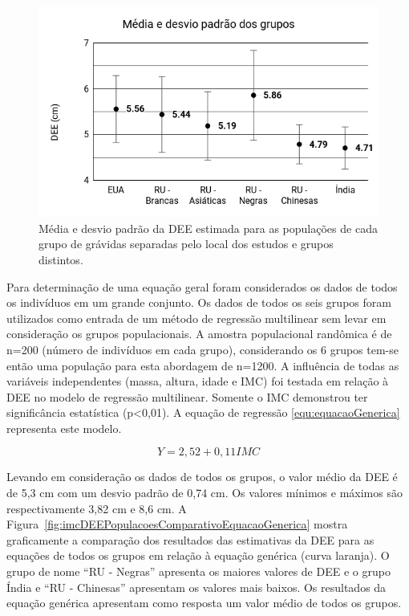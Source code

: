 \begin{figure}[ht!]
    \centering
    \includegraphics[width=0.8\linewidth]{capitulos/figuras/Media e desvio padrao dos grupos.png} 
    \caption{Média e desvio padrão da \acrshort{DEE} estimada para as populações de cada grupo de grávidas separadas pelo local dos estudos e grupos distintos.}
    \label{fig:mediaDesvioPadraoPopulacoes}
\end{figure}

Para determinação de uma equação geral foram considerados os dados de todos os indivíduos em um grande conjunto. Os dados de todos os seis grupos foram utilizados como entrada de um método de regressão multilinear sem levar em consideração os grupos populacionais. A amostra populacional randômica é de n=200 (número de indivíduos em cada grupo), considerando os 6 grupos tem-se então uma população para esta abordagem de n=1200. A influência de todas as variáveis independentes (massa, altura, idade e \acrshort{IMC}) foi testada em relação à \acrshort{DEE} no modelo de regressão multilinear. Somente o \acrshort{IMC} demonstrou ter significância estatística (p<0,01). A equação de regressão \ref{equ:equacaoGenerica} representa este modelo. 

\begin{equation}
\label{equ:equacaoGenerica}
Y=2,52+0,11 IMC
\end{equation}

Levando em consideração os dados de todos os grupos, o valor médio da \acrshort{DEE} é de 5,3 cm com um desvio padrão de 0,74 cm. Os valores mínimos e máximos são respectivamente 3,82 cm e 8,6 cm. A Figura~\ref{fig:imcDEEPopulacoesComparativoEquacaoGenerica} mostra graficamente a comparação dos resultados das estimativas da  \acrshort{DEE} para as equações de todos os grupos em relação à equação genérica (curva laranja). O grupo de nome ``RU - Negras'' apresenta os maiores valores de \acrshort{DEE} e o grupo Índia e ``RU - Chinesas'' apresentam os valores mais baixos. Os resultados da equação genérica apresentam como resposta um valor médio de todos os grupos.

